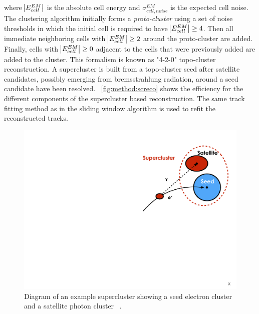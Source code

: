 where $\abs{E^{EM}_{cell}}$ is the absolute cell energy and $\sigma^{EM}_{cell,noise}$ is the expected cell noise. The clustering algorithm initially forms a \emph{proto-cluster} using a set of noise thresholds in which the initial cell is required to have $\abs{E^{EM}_{cell}} \geq 4$. Then all immediate neighboring cells with $\abs{E^{EM}_{cell}} \geq 2$ around the proto-cluster are added. Finally, cells with $\abs{E^{EM}_{cell}} \geq 0$ adjacent to the cells that were previously added are added to the cluster. This formalism is known as "4-2-0" topo-cluster reconstruction.
A supercluster is built from a topo-cluster seed after satellite candidates, possibly emerging from bremsstrahlung radiation, around a seed candidate have been resolved. ~\cref{fig:method:screco} shows the efficiency for the different components of the supercluster based reconstruction. The same track fitting method as in the sliding window algorithm is used to refit the reconstructed tracks.
\begin{figure}[]
    \centering
    \includegraphics[width=\mediumfigwidth]{images/topo-cluster.pdf}
    \caption[Diagram of an example supercluster showing a seed electron cluster and a satellite photon cluster.]{Diagram of an example supercluster showing a seed electron cluster and a satellite photon cluster ~\cite{ATL-PHYS-PUB-2017-022}.}
    \label{fig:method:superclusterscheme}
\end{figure}
